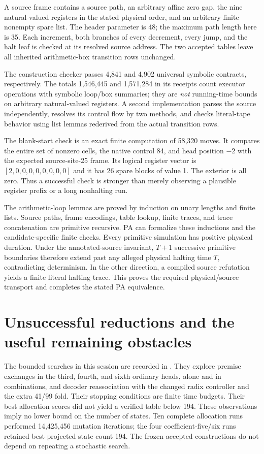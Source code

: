 \documentclass[11pt,letterpaper]{article}
\newcommand{\file}[1]{\texttt{\path{#1}}}
\begin{document}
A source frame contains a source path, an arbitrary affine zero gap,
the nine natural-valued registers in the stated physical order, and an
arbitrary finite nonempty spare list. The header parameter is 48; the
maximum path length here is 35. Each increment, both branches of every
decrement, every jump, and the halt leaf is checked at its resolved source
address. The two accepted tables leave all inherited arithmetic-box
transition rows unchanged.

The construction checker passes 4,841 and 4,902 universal symbolic
contracts, respectively. The totals 1,546,445 and 1,571,284 in its receipts
count executor operations with symbolic loop/box summaries; they are
\emph{not} running-time bounds on arbitrary natural-valued registers.
A second implementation parses the source independently, resolves its
control flow by two methods, and checks literal-tape behavior using list
lemmas rederived from the actual transition rows.


The blank-start check is an exact finite computation of 58,320 moves.
It compares the entire set of nonzero cells, the native control 84, and
head position $-2$ with the expected source-site-25 frame. Its logical
register vector is $[2,0,0,0,0,0,0,0,0]$ and it has 26 spare blocks of
value 1. The exterior is all zero. Thus a successful check is stronger
than merely observing a plausible register prefix or a long nonhalting
run.

The arithmetic-loop lemmas are proved by induction on unary lengths and
finite lists. Source paths, frame encodings, table lookup, finite traces,
and trace concatenation are primitive recursive. PA can formalize these
inductions and the candidate-specific finite checks. Every primitive
simulation has positive physical duration. Under the annotated-source
invariant, $T+1$ successive primitive boundaries therefore extend past
any alleged physical halting time $T$, contradicting determinism. In the
other direction, a compiled source refutation yields a finite literal
halting trace. This proves the required physical/source transport and
completes the stated PA equivalence.

\section{Unsuccessful reductions and the useful remaining obstacles}

The bounded searches in this session are recorded in
\file{search/summary.json}. They explore premise exchanges in the third,
fourth, and sixth ordinary heads, alone and in combinations, and decoder
reassociation with the changed radix controller and the extra 41/99
fold. Their stopping conditions are finite time budgets. Their best
allocation scores did not yield a verified table below 194. These
observations imply no lower bound on the number of states.
Ten complete allocation runs performed 14,425,456 mutation iterations;
the four coefficient-five/six runs retained best projected state count
194. The frozen accepted constructions do not depend on repeating a
stochastic search.
\end{document}
